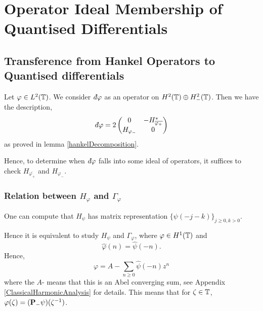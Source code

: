 
\chapter{Operator Ideal Membership of Quantised Differentials} %

\label{IdealMembership} %


\section{Transference from Hankel Operators to Quantised differentials}
Let $\varphi \in L^2(\mathbb{T})$. We consider $\qd \varphi$
as an operator on $H^2(\mathbb{T})\oplus H^2_-(\mathbb{T})$. Then we have the description,
\begin{equation}
\label{quantumMatrix}
    \qd \varphi = 2\begin{pmatrix}
        0 & -H_{\overline{\varphi_+}}^*\\
        H_{\varphi_-}  & 0
    \end{pmatrix}
\end{equation}
as proved in lemma \ref{hankelDecomposition}.


Hence, to determine when $\qd \varphi$ falls into some ideal of operators,
it suffices to check $H_{\overline{\varphi_+}}$ and $H_{\varphi_-}$.


\subsection{Relation between $H_\varphi$ and $\Gamma_\varphi$}
One can compute that $H_\psi$ has matrix representation $\{\psi(-j-k)\}_{j\geq 0,k > 0}$.

Hence it is equivalent to study $H_\psi$ and $\Gamma_\varphi$, where $\varphi \in H^1(\mathbb{T})$
and
\begin{equation}
    \hat{\varphi}(n) = \hat{\psi}(-n).
\end{equation}
Hence,
\begin{equation}
    \varphi = A-\sum_{n\geq 0} \hat{\psi}(-n)z^n
\end{equation}
where the $A$- means that this is an Abel converging sum, see Appendix \ref{ClassicalHarmonicAnalysis}
for details. This means that for $\zeta \in \mathbb{T}$, $\varphi(\zeta) = (\mathbf{P}_- \psi)(\zeta^{-1})$.

